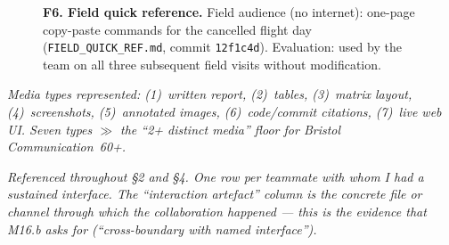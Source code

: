 \begin{figure}[h!]
\centering
\begin{minipage}[t]{0.48\textwidth}
  \centering
  \fbox{\rule{0pt}{4cm}\rule{\linewidth}{0pt}}
  \caption*{\footnotesize\textbf{F5. Project dashboard (non-technical).} Non-technical audience: prospective operator / external viewer. React app at \texttt{dashboard/}: status as \%complete and RAG, technical detail hidden behind expandable panels. Adaptation: jargon replaced with mission verbs; see §4.b.}
\end{minipage}\hfill
\begin{minipage}[t]{0.48\textwidth}
  \centering
  \fbox{\rule{0pt}{4cm}\rule{\linewidth}{0pt}}
  \caption*{\footnotesize\textbf{F6. Field quick reference.} Field audience (no internet): one-page copy-paste commands for the cancelled flight day (\texttt{FIELD\_QUICK\_REF.md}, commit \texttt{12f1c4d}). Evaluation: used by the team on all three subsequent field visits without modification.}
\end{minipage}
\end{figure}

\vspace{0.5em}
\noindent\textit{Media types represented: (1)~written report, (2)~tables,
(3)~matrix layout, (4)~screenshots, (5)~annotated images, (6)~code/commit citations,
(7)~live web UI. Seven types $\gg$ the ``2+ distinct media'' floor for Bristol Communication~60+.}

\newpage

\noindent\textit{Referenced throughout §2 and §4. One row per teammate with whom I
had a sustained interface. The ``interaction artefact'' column is the concrete file
or channel through which the collaboration happened --- this is the evidence that
M16.b asks for (``cross-boundary with named interface'').}

